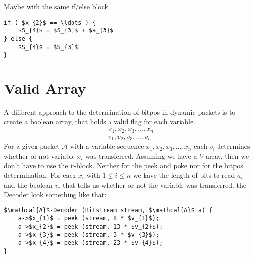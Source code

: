 \documentclass[parskip=full,paper=a4,DIV=12]{scrartcl}
\begin{document}
Maybe with the same if/else block:

\begin{lstlisting}[mathescape]
if ( $x_{2}$ == \ldots ) {
	$S_{4}$ = $S_{3}$ + $a_{3}$
} else {
	$S_{4}$ = $S_{3}$
}
\end{lstlisting}

\section{Valid Array}

A different approach to the determination of bitpos in dynamic packets is to create a boolean array, that holds a valid flag for each variable.
\begin{align*}
	&x_{1}, x_{2}, x_{3}, \ldots , x_{n}\\
	&v_{1}, v_{2}, v_{3}, \ldots , v_{n}	
\end{align*}
For a given packet $\mathcal{A}$ with a variable sequence $x_{1}, x_{2}, x_{3}, \ldots , x_{n}$ each $v_{i}$ determines whether or not variable $x_{i}$ was transferred.
Assuming we have a $V$-array, then we don't have to use the if-block.
Neither for the peek and poke nor for the bitpos determination.
For each $x_{i}$ with $1\leq i\leq n$ we have the length of bits to read $a_{i}$ and the boolean $v_{i}$ that tells us whether or not the variable was transferred.
the Decoder look something like that:
\begin{lstlisting}[mathescape]
$\mathcal{A}$-Decoder (Bitstream stream, $\mathcal{A}$ a) {
	a->$x_{1}$ = peek (stream, 8 * $v_{1}$);
	a->$x_{2}$ = peek (stream, 13 * $v_{2}$);
	a->$x_{3}$ = peek (stream, 3 * $v_{3}$);
	a->$x_{4}$ = peek (stream, 23 * $v_{4}$);
}
\end{lstlisting}
\end{document}

